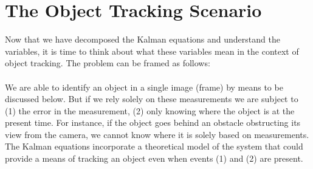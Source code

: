 \documentclass{article} %
\begin{document}
\section{The Object Tracking Scenario}
Now that we have decomposed the Kalman equations and understand the variables, it is time to think about what these variables mean in the context of object tracking. The problem can be framed as follows: \\\\
We are able to identify an object in a single image (frame) by means to be discussed below. But if we rely solely on these measurements we are subject to (1) the error in the measurement, (2) only knowing where the object is at the present time. For instance, if the object goes behind an obstacle obstructing its view from the camera, we cannot know where it is solely based on measurements. The Kalman equations incorporate a theoretical model of the system that could provide a means of tracking an object even when events (1) and (2) are present.
\end{document}
